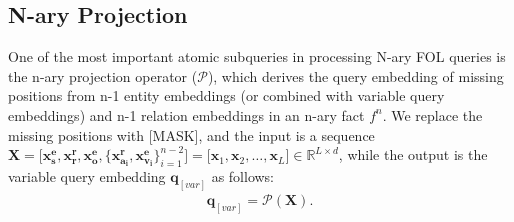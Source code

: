 \documentclass[letterpaper]{article} \usepackage{aaai23}  \usepackage{times}  \usepackage{helvet}  \usepackage{courier}  \usepackage[hyphens]{url}  \usepackage{graphicx} \urlstyle{rm} \def\UrlFont{\rm}  \usepackage{natbib}  \usepackage{caption} \frenchspacing  \setlength{\pdfpagewidth}{8.5in}  \setlength{\pdfpageheight}{11in}  \usepackage{algorithm}
\begin{document}
\subsection{N-ary Projection}

One of the most important atomic subqueries in processing N-ary FOL queries is the n-ary projection operator ($\mathcal{P}$), which derives the query embedding of missing positions from n-1 entity embeddings (or combined with variable query embeddings) and n-1 relation embeddings in an n-ary fact $f^n$. We replace the missing positions with [MASK], and the input is a sequence $\boldsymbol{X}=\big[\boldsymbol{x^e_s},\boldsymbol{x^r_r},\boldsymbol{x^e_o},\{\boldsymbol{x^r_{a_i}},\boldsymbol{x^e_{v_i}}\}_{i=1}^{n-2}\big]=\big[\boldsymbol{x}_1,\boldsymbol{x}_2,\ldots,\boldsymbol{x}_L\big] \in \mathbb{R}^{L\times d}$, while the output is the variable query embedding $\boldsymbol{q}_{[var]}$ as follows:
\begin{equation}
\begin{aligned}
\boldsymbol{q}_{[var]}=\mathcal{P}(\boldsymbol{X}).
\end{aligned}
\end{equation}
\end{document}
